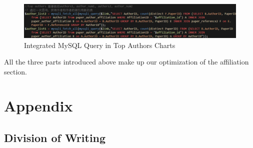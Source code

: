\documentclass{book}
\begin{document}
\begin{figure}[H]
\centering{}
\includegraphics[scale=0.55]{img/zlt_opt_code_chart.png}
\caption{Integrated MySQL Query in Top Authors Charts}
\end{figure}

All the three parts introduced above make up our optimization of the affiliation section.


\backmatter

\chapter {Appendix}

\section*{Division of Writing}
\end{document}
